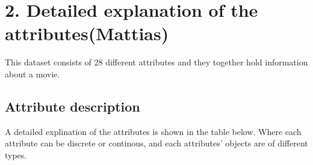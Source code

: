 \documentclass[11pt]{article}
\begin{document}
    \section{2. Detailed explanation of the
attributes(Mattias)}\label{detailed-explanation-of-the-attributesmattias}

This dataset consists of 28 different attributes and they together hold
information about a movie.

\subsection{Attribute description}\label{attribute-description}

A detailed explination of the attributes is shown in the table below.
Where each attribute can be discrete or continous, and each attributes'
objects are of different types. 
\end{document}
